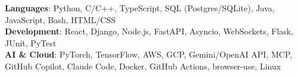 \begin{itemize}[leftmargin=0.15in, label={}]
    \small{\item{
     \textbf{Languages}{: Python, C/C++, TypeScript, SQL (Postgres/SQLite), Java, JavaScript, Bash, HTML/CSS} \\
     \textbf{Development}{: React, Django, Node.js, FastAPI, Asyncio, WebSockets, Flask, JUnit, PyTest} \\
     \textbf{AI \& Cloud}{: PyTorch, TensorFlow, AWS, GCP, Gemini/OpenAI API, MCP, GitHub Copilot, Claude Code, Docker, GitHub Actions, browser-use, Linux}
    }}
\end{itemize}